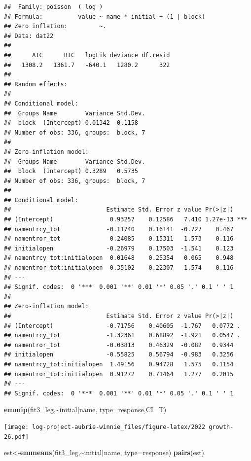 \documentclass[
]{article}
\newenvironment{Shaded}{\begin{snugshade}}{\end{snugshade}}
\newcommand{\AttributeTok}[1]{\textcolor[rgb]{0.13,0.29,0.53}{#1}}
\newcommand{\FunctionTok}[1]{\textcolor[rgb]{0.13,0.29,0.53}{\textbf{#1}}}
\newcommand{\NormalTok}[1]{#1}
\newcommand{\OtherTok}[1]{\textcolor[rgb]{0.56,0.35,0.01}{#1}}
\newcommand{\SpecialCharTok}[1]{\textcolor[rgb]{0.81,0.36,0.00}{\textbf{#1}}}
\newcommand{\StringTok}[1]{\textcolor[rgb]{0.31,0.60,0.02}{#1}}
\begin{document}
\begin{verbatim}
##  Family: poisson  ( log )
## Formula:          value ~ name * initial + (1 | block)
## Zero inflation:         ~.
## Data: dat22
## 
##      AIC      BIC   logLik deviance df.resid 
##   1308.2   1361.7   -640.1   1280.2      322 
## 
## Random effects:
## 
## Conditional model:
##  Groups Name        Variance Std.Dev.
##  block  (Intercept) 0.01342  0.1158  
## Number of obs: 336, groups:  block, 7
## 
## Zero-inflation model:
##  Groups Name        Variance Std.Dev.
##  block  (Intercept) 0.3289   0.5735  
## Number of obs: 336, groups:  block, 7
## 
## Conditional model:
##                           Estimate Std. Error z value Pr(>|z|)    
## (Intercept)                0.93257    0.12586   7.410 1.27e-13 ***
## namentrcy_tot             -0.11740    0.16141  -0.727    0.467    
## namentror_tot              0.24085    0.15311   1.573    0.116    
## initialopen               -0.26979    0.17503  -1.541    0.123    
## namentrcy_tot:initialopen  0.01648    0.25354   0.065    0.948    
## namentror_tot:initialopen  0.35102    0.22307   1.574    0.116    
## ---
## Signif. codes:  0 '***' 0.001 '**' 0.01 '*' 0.05 '.' 0.1 ' ' 1
## 
## Zero-inflation model:
##                           Estimate Std. Error z value Pr(>|z|)  
## (Intercept)               -0.71756    0.40605  -1.767   0.0772 .
## namentrcy_tot             -1.32361    0.68892  -1.921   0.0547 .
## namentror_tot             -0.03813    0.46329  -0.082   0.9344  
## initialopen               -0.55825    0.56794  -0.983   0.3256  
## namentrcy_tot:initialopen  1.49156    0.94728   1.575   0.1154  
## namentror_tot:initialopen  0.91272    0.71464   1.277   0.2015  
## ---
## Signif. codes:  0 '***' 0.001 '**' 0.01 '*' 0.05 '.' 0.1 ' ' 1
\end{verbatim}

\begin{Shaded}
\begin{Highlighting}[]
\FunctionTok{emmip}\NormalTok{(fit3\_leg,}\SpecialCharTok{\textasciitilde{}}\NormalTok{initial}\SpecialCharTok{|}\NormalTok{name, }\AttributeTok{type=}\StringTok{\textquotesingle{}response\textquotesingle{}}\NormalTok{,}\AttributeTok{CI=}\NormalTok{T)}
\end{Highlighting}
\end{Shaded}

\texttt{[image: log-project-aubrie-winnie\_files/figure-latex/2022 growth-26.pdf]}

\begin{Shaded}
\begin{Highlighting}[]
\NormalTok{est}\OtherTok{\textless{}{-}}\FunctionTok{emmeans}\NormalTok{(fit3\_leg,}\SpecialCharTok{\textasciitilde{}}\NormalTok{initial}\SpecialCharTok{|}\NormalTok{name, }\AttributeTok{type=}\StringTok{\textquotesingle{}response\textquotesingle{}}\NormalTok{)}
\FunctionTok{pairs}\NormalTok{(est)}
\end{Highlighting}
\end{Shaded}
\end{document}
